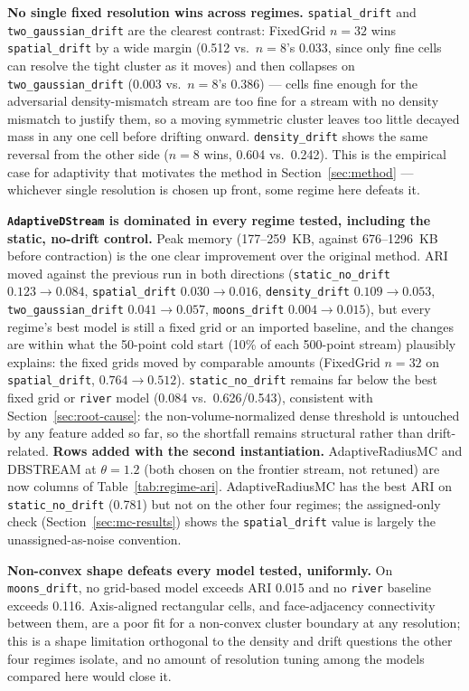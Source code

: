 \documentclass[11pt]{article}
\begin{document}
\textbf{No single fixed resolution wins across regimes.} \texttt{spatial\_drift} and \texttt{two\_gaussian\_drift} are the clearest contrast: FixedGrid $n{=}32$ wins \texttt{spatial\_drift} by a wide margin (0.512 vs.\ $n{=}8$'s 0.033, since only fine cells can resolve the tight cluster as it moves) and then collapses on \texttt{two\_gaussian\_drift} (0.003 vs.\ $n{=}8$'s 0.386) — cells fine enough for the adversarial density-mismatch stream are too fine for a stream with no density mismatch to justify them, so a moving symmetric cluster leaves too little decayed mass in any one cell before drifting onward. \texttt{density\_drift} shows the same reversal from the other side ($n{=}8$ wins, 0.604 vs.\ 0.242). This is the empirical case for adaptivity that motivates the method in Section~\ref{sec:method} — whichever single resolution is chosen up front, some regime here defeats it.

\textbf{\texttt{AdaptiveDStream} is dominated in every regime tested, including the static, no-drift control.} Peak memory (177--259~KB, against 676--1296~KB before contraction) is the one clear improvement over the original method. ARI moved against the previous run in both directions (\texttt{static\_no\_drift} $0.123\to0.084$, \texttt{spatial\_drift} $0.030\to0.016$, \texttt{density\_drift} $0.109\to0.053$, \texttt{two\_gaussian\_drift} $0.041\to0.057$, \texttt{moons\_drift} $0.004\to0.015$), but every regime's best model is still a fixed grid or an imported baseline, and the changes are within what the 50-point cold start (10\% of each 500-point stream) plausibly explains: the fixed grids moved by comparable amounts (FixedGrid $n{=}32$ on \texttt{spatial\_drift}, $0.764\to0.512$). \texttt{static\_no\_drift} remains far below the best fixed grid or \texttt{river} model (0.084 vs.\ 0.626/0.543), consistent with Section~\ref{sec:root-cause}: the non-volume-normalized dense threshold is untouched by any feature added so far, so the shortfall remains structural rather than drift-related. \textbf{Rows added with the second instantiation.} AdaptiveRadiusMC and DBSTREAM at $\theta{=}1.2$ (both chosen on the frontier stream, not retuned) are now columns of Table~\ref{tab:regime-ari}. AdaptiveRadiusMC has the best ARI on \texttt{static\_no\_drift} (0.781) but not on the other four regimes; the assigned-only check (Section~\ref{sec:mc-results}) shows the \texttt{spatial\_drift} value is largely the unassigned-as-noise convention.

\textbf{Non-convex shape defeats every model tested, uniformly.} On \texttt{moons\_drift}, no grid-based model exceeds ARI 0.015 and no \texttt{river} baseline exceeds 0.116. Axis-aligned rectangular cells, and face-adjacency connectivity between them, are a poor fit for a non-convex cluster boundary at any resolution; this is a shape limitation orthogonal to the density and drift questions the other four regimes isolate, and no amount of resolution tuning among the models compared here would close it.
\end{document}
